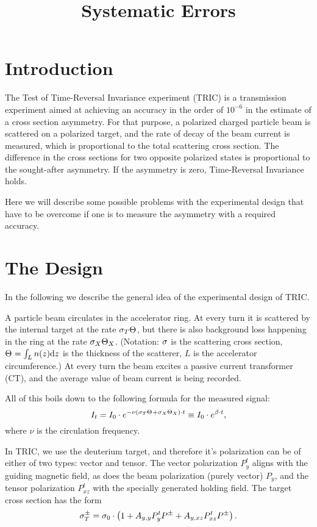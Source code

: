 \documentclass{article}
\begin{document}
\title{Systematic Errors}
\maketitle

\section*{Introduction}

The Test of Time-Reversal Invariance experiment (TRIC) is a transmission experiment aimed at achieving an accuracy in the order of $10^{-6}$ in the estimate of a cross section asymmetry. For that purpose, a polarized charged particle beam is scattered on a polarized target, and the rate of decay of the beam current is measured, which is proportional to the total scattering cross section. The difference in the cross sections for two opposite polarized states is proportional to the sought-after asymmetry. If the asymmetry is zero, Time-Reversal Invariance holds.

Here we will describe some possible problems with the experimental design that have to be overcome if one is to measure the asymmetry with a required accuracy.

\section{The Design}
In the following we describe the general idea of the experimental design of TRIC.

A particle beam circulates in the accelerator ring. At every turn it is scattered by the internal target at the rate $\CS[T]\Thick$, but there is also background loss happening in the ring at the rate $\CS[X]\Thick[X]$. (Notation: $\CS$ is the scattering cross section, $\Thick = \int_L n(z)\td z$ is the thickness of the scatterer, $L$ is the accelerator circumference.) At every turn the beam excites a passive current transformer (CT), and the average value of beam current is being recorded. 

All of this boils down to the following formula for the measured signal:
\[
	I_t  = I_0 \cdot e^{-\nu\bkt{\CS[T]\Thick + \CS[X]\Thick[X]}\cdot t} \equiv I_0\cdot e^{\slp\cdot t},
\]
where $\nu$ is the circulation frequency.

In TRIC, we use the deuterium target, and therefore it's polarization can be of either of two types: vector and tensor. The vector polarization $P^t_y$ aligns with the guiding magnetic field, as does the beam polarization (purely vector) $P_y$, and the tensor polarization $P^t_{xz}$ with the specially generated holding field.  The target cross section has the form
\begin{equation}\label{eq:CrossSection}
	\CS[T]^\pm = \CS[0]\cdot\bkt{1 + \Ayy P^t_y P^\pm + \Ayxz P^t_{xz} P^\pm}.
\end{equation}
\end{document}
